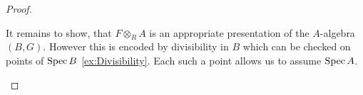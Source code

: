 \begin{proof}
\begin{itemize}

	It remains to show, that $F \otimes_R A$ is an appropriate presentation of the $A$-algebra $(B,G)$. However this is encoded by divisibility in $B$ which can be checked on points of $\operatorname{Spec} B$ \ref{ex:Divisibility}. Each such a point allows us to assume $\operatorname{Spec} A$. %
		\end{itemize}
	
\end{proof}

